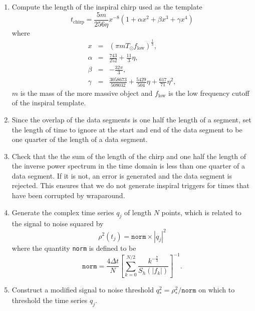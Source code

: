 \begin{enumerate}

\item Compute the length of the inspiral chirp used as the template
\begin{equation}
t_\mathrm{chirp} = \frac{5m}{256\eta} 
  x^{-8}\left(1 + \alpha x^2 + \beta x^3 + \gamma x^4 \right)
\end{equation}
where
\begin{eqnarray}
x & = & \left(\pi m T_\odot f_{\mathrm{low}}\right)^{\frac{1}{3}}, \\
\alpha & = & \frac{743}{252} + \frac{11}{3}\eta, \\
\beta & = & -\frac{32\pi}{3}, \\
\gamma & = & \frac{3058673}{508032}+\frac{5429}{504}\eta+\frac{617}{71}\eta^2,
\end{eqnarray}
$m$ is the mass of the more massive object and $f_{\mathrm{low}}$ is the low
frequency cutoff of the inspiral template.

\item Since the overlap of the data segments is one half the length of a
segment, set the length of time to ignore at the start and end of the data
segment to be one quarter of the length of a data segment.

\item Check that the the sum of the length of the chirp and one half the
length of the inverse power spectrum in the time domain is less than one
quarter of a data segment. If it is not, an error is generated and the data
segment is rejected. This ensures that we do not generate inspiral triggers
for times that have been corrupted by wraparound.

\item Generate the complex time series $q_j$ of length $N$ points, which is
related to the signal to noise squared by
\begin{equation}
\rho^2(t_j) = \mathtt{norm} \times |q_j|^2
\end{equation}
where the quantity \texttt{norm} is defined to be
\begin{equation}
\mathtt{norm} = \frac{4\Delta t}{N} \left[ \sum_{k=0}^{N/2}
\frac{k^{-\frac{7}{3}}}{S_h(|f_k|)} \right]^{-1}.
\end{equation}

\item Construct a modified signal to noise threshold $q^2_\ast = \rho^2_{\ast}
/ \mathtt{norm}$ on which to threshold the time series $q_j$.


\end{enumerate}

